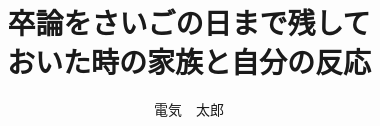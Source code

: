 \documentclass{ltjsarticle}
\title{卒論をさいごの日まで残して\\おいた時の家族と自分の反応}
\date{\formatdate{8}{2}{2023}} %
\author{電気　太郎}
\begin{document}
\eeictitlepage %
\end{document}
